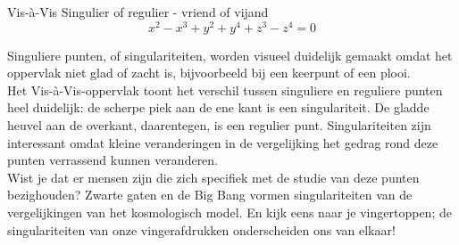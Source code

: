 \begin{surferPage}{Vis-\`a-Vis}
Singulier of regulier - vriend of vijand\\
\smallskip
\[x^2	- x^3+ y^2+ y^4+ z^3- z^4	=  0\]

\vspace{0.3cm}
Singuliere punten, of singulariteiten, worden visueel duidelijk gemaakt omdat het oppervlak niet glad of zacht is, bijvoorbeeld bij een keerpunt of een plooi.\\
\vspace{0.3cm}
Het Vis-\`a-Vis-oppervlak toont het verschil tussen singuliere en reguliere punten heel duidelijk: de scherpe piek aan de ene kant is een singulariteit. De gladde heuvel aan de overkant, daarentegen, is een regulier punt. Singulariteiten zijn interessant omdat kleine veranderingen in de vergelijking het gedrag rond deze punten verrassend kunnen veranderen. \\

\vspace{0.3cm}
Wist je dat er mensen zijn die zich specifiek met de studie van deze punten bezighouden? Zwarte gaten en de Big Bang vormen singulariteiten van de vergelijkingen van het kosmologisch model. En kijk eens naar je vingertoppen; de singulariteiten van onze vingerafdrukken onderscheiden ons van elkaar!
\end{surferPage}

